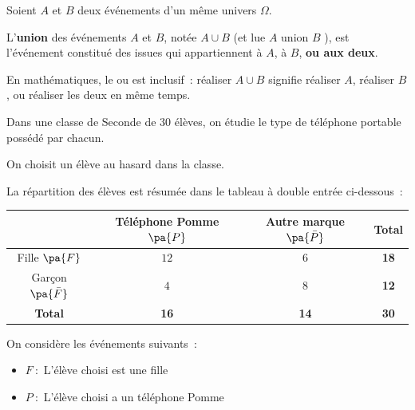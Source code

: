 \begin{defin}
	Soient $A$ et $B$ deux événements d'un même univers $\Omega$.

	L'\textbf{union} des événements $A$ et $B$, notée $A \cup B$ (et lue \og $A$ union $B$ \fg{}), est l'événement constitué des issues qui appartiennent à $A$, à $B$, \textbf{ou aux deux}.
\end{defin}

\begin{rem}
	En mathématiques, le \og ou \fg{} est inclusif~: réaliser $A \cup B$ signifie réaliser $A$, réaliser $B$, ou réaliser les deux en même temps.
\end{rem}

\begin{ex}
	Dans une classe de Seconde de $30$ élèves, on étudie le type de téléphone portable possédé par chacun.

	On choisit un élève au hasard dans la classe.

	La répartition des élèves est résumée dans le tableau à double entrée ci-dessous~:

	\begin{center}
		\begin{tabular}{|c|c|c|c|}
			\hline
			\cellcolor{gray!30}   & \cellcolor{gray!30}Téléphone Pomme $\pa{P}$ & \cellcolor{gray!30}Autre marque $\pa{\bar{P}}$ & \cellcolor{gray!30}\textbf{Total} \\ \hline
			Fille $\pa{F}$        & $12$                                        & $6$                                            & \textbf{18}                       \\ \hline
			Garçon $\pa{\bar{F}}$ & $4$                                         & $8$                                            & \textbf{12}                       \\ \hline
			\textbf{Total}        & \textbf{16}                                 & \textbf{14}                                    & \textbf{30}                       \\ \hline
		\end{tabular}
	\end{center}

	On considère les événements suivants~:
	\begin{itemize}
		\item $F~:$ \og L'élève choisi est une fille \fg{}
		\item $P~:$ \og L'élève choisi a un téléphone Pomme \fg{}
	\end{itemize}


\end{ex}
